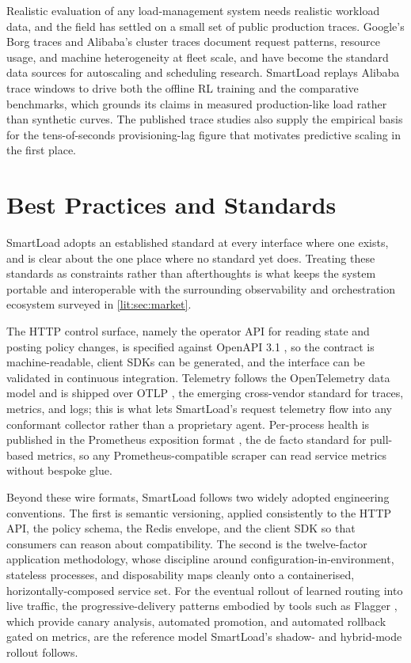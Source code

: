 Realistic evaluation of any load-management system needs realistic workload
data, and the field has settled on a small set of public production traces.
Google's Borg traces \cite{verma2015borg, tirmazi2020borg} and Alibaba's
cluster traces \cite{guo2019alibaba} document request patterns, resource usage,
and machine heterogeneity at fleet scale, and have become the standard data
sources for autoscaling and scheduling research. SmartLoad replays Alibaba
trace windows to drive both the offline RL training and the comparative
benchmarks, which grounds its claims in measured production-like load rather
than synthetic curves. The published trace studies also supply the empirical
basis for the tens-of-seconds provisioning-lag figure that motivates predictive
scaling in the first place.

\section{Best Practices and Standards}
\label{lit:sec:standards}

SmartLoad adopts an established standard at every interface where one exists,
and is clear about the one place where no standard yet does. Treating these
standards as constraints rather than afterthoughts is what keeps the system
portable and interoperable with the surrounding observability and orchestration
ecosystem surveyed in \cref{lit:sec:market}.

The HTTP control surface, namely the operator API for reading state and posting
policy changes, is specified against OpenAPI 3.1 \cite{openapi}, so the
contract is machine-readable, client SDKs can be generated, and the interface
can be validated in continuous integration. Telemetry follows the OpenTelemetry
data model and is shipped over OTLP \cite{opentelemetry}, the emerging
cross-vendor standard for traces, metrics, and logs; this is what lets
SmartLoad's request telemetry flow into any conformant collector rather than a
proprietary agent. Per-process health is published in the Prometheus exposition
format \cite{prometheus}, the de facto standard for pull-based metrics, so any
Prometheus-compatible scraper can read service metrics without bespoke glue.

Beyond these wire formats, SmartLoad follows two widely adopted engineering
conventions. The first is semantic versioning, applied consistently to the HTTP
API, the policy schema, the Redis envelope, and the client SDK so that consumers
can reason about compatibility. The second is the twelve-factor application
methodology, whose discipline around configuration-in-environment, stateless
processes, and disposability maps cleanly onto a containerised,
horizontally-composed service set. For the eventual rollout of learned routing
into live traffic, the progressive-delivery patterns embodied by tools such as
Flagger \cite{flagger}, which provide canary analysis, automated promotion, and
automated rollback gated on metrics, are the reference model SmartLoad's shadow-
and hybrid-mode rollout follows.

